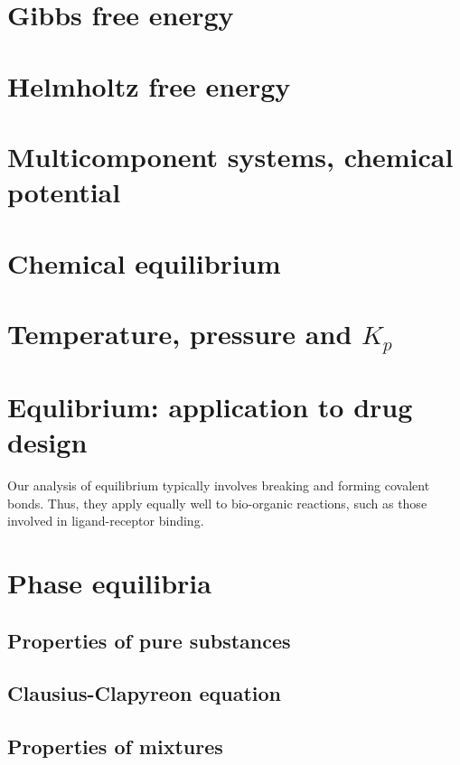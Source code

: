 \documentclass{article}
\numberwithin{theorem}{section}
\numberwithin{corollary}{section}
\numberwithin{postulate}{section}
\numberwithin{lemma}{section}
\numberwithin{definition}{section}
\begin{document}
\section{Gibbs free energy}

\section{Helmholtz free energy}

\section{Multicomponent systems, chemical potential}

\section{Chemical equilibrium}

\section{Temperature, pressure and $K_p$}

\section{Equlibrium: application to drug design}

Our analysis of equilibrium typically involves breaking and forming covalent
bonds. Thus, they apply equally well to bio-organic reactions, such as those
involved in ligand-receptor binding.

\section{Phase equilibria}

\subsection{Properties of pure substances}

\subsection{Clausius-Clapyreon equation}

\subsection{Properties of mixtures}
\end{document}
